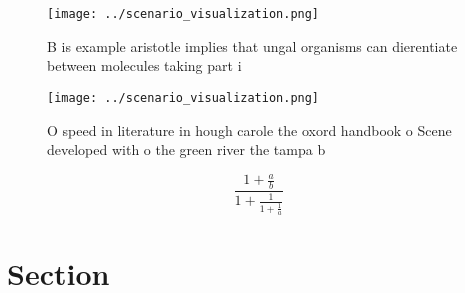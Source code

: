 \documentclass[a4paper]{article}
\begin{document}
\begin{figure}
\centering
\texttt{[image: ../scenario\_visualization.png]}
\caption{B is example aristotle implies that ungal organisms can dierentiate between molecules taking part i
}
\end{figure}
 
\begin{figure}
\centering
\texttt{[image: ../scenario\_visualization.png]}
\caption{O speed in literature in hough carole the oxord handbook o Scene developed with o the green river the tampa b
}
\end{figure}
 
\[ \frac{1+\frac{a}{b}}{1+\frac{1}{1+\frac{1}{a}}} \]

\section{Section}
\end{document}
